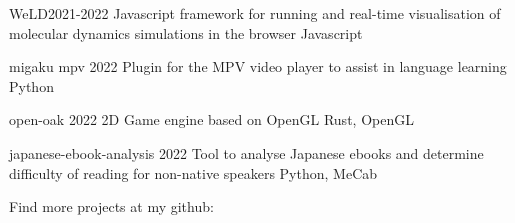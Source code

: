 %
%
%

\begin{projects}
	\project
	{WeLD}{2021-2022}
	{}
	{Javascript framework for running and real-time visualisation of molecular dynamics simulations in the browser}
	{Javascript}
	
	\project
	{migaku mpv}
	{2022}
	{}
	{Plugin for the MPV video player to assist in language learning}
	{Python}
	
	\project
	{open-oak}
	{2022}
	{}
	{2D Game engine based on OpenGL}
	{Rust, OpenGL}
	
	\project
	{japanese-ebook-analysis}
	{2022}
	{}
	{Tool to analyse Japanese ebooks and determine difficulty of reading for non-native speakers}
	{Python, MeCab}
	
	Find more projects at my github: 
\end{projects}
